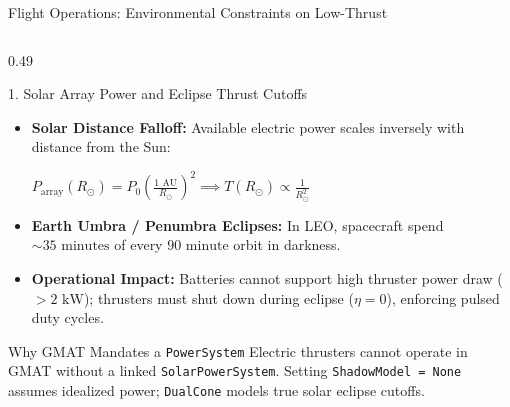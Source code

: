 \documentclass[aspectratio=169, 10pt]{beamer}
\begin{document}
\begin{frame}{Flight Operations: Environmental Constraints on Low-Thrust}
    \begin{columns}[T]
        \begin{column}{0.49\textwidth}
            \begin{block}{1. Solar Array Power and Eclipse Thrust Cutoffs}
                \scriptsize
                \begin{itemize}\setlength{\itemsep}{1.5pt}\setlength{\topsep}{0pt}
                    \item \textbf{Solar Distance Falloff:} Available electric power scales inversely with distance from the Sun:
                    \par\vspace{1pt}
                    {\centering $\displaystyle P_{\text{array}}(R_\odot) = P_0 \left(\frac{1\text{ AU}}{R_\odot}\right)^2 \implies T(R_\odot) \propto \frac{1}{R_\odot^2}$ \par}
                    \item \textbf{Earth Umbra / Penumbra Eclipses:} In LEO, spacecraft spend $\sim 35\text{ minutes}$ of every $90\text{ minute}$ orbit in darkness.
                    \item \textbf{Operational Impact:} Batteries cannot support high thruster power draw ($> 2\text{ kW}$); thrusters must shut down during eclipse ($\eta = 0$), enforcing pulsed duty cycles.
                \end{itemize}
            \end{block}
            \vspace{-0.15cm}
            \begin{alertblock}{Why GMAT Mandates a \texttt{PowerSystem}}
                \scriptsize
                Electric thrusters cannot operate in GMAT without a linked \texttt{SolarPowerSystem}. Setting \texttt{ShadowModel = None} assumes idealized power; \texttt{DualCone} models true solar eclipse cutoffs.
            \end{alertblock}
        \end{column}


\end{columns}
\end{frame}
\end{document}
